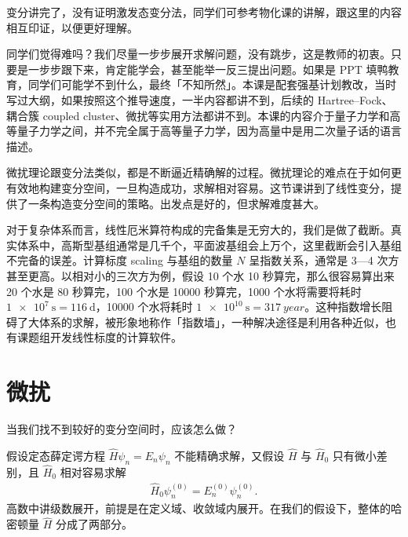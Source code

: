 
变分讲完了，没有证明激发态变分法，同学们可参考物化课的讲解，跟这里的内容相互印证，以便更好理解。

同学们觉得难吗？我们尽量一步步展开求解问题，没有跳步，这是教师的初衷。只要是一步步跟下来，肯定能学会，甚至能举一反三提出问题。如果是 PPT 填鸭教育，同学们可能学不到什么，最终「不知所然」。本课是配套强基计划教改，当时写过大纲，如果按照这个推导速度，一半内容都讲不到，后续的 Hartree--Fock、耦合簇 coupled cluster、微扰等实用方法都讲不到。本课的内容介于量子力学和高等量子力学之间，并不完全属于高等量子力学，因为高量中是用二次量子话的语言描述。

微扰理论跟变分法类似，都是不断逼近精确解的过程。微扰理论的难点在于如何更有效地构建变分空间，一旦构造成功，求解相对容易。这节课讲到了线性变分，提供了一条构造变分空间的策略。出发点是好的，但求解难度甚大。

对于复杂体系而言，线性厄米算符构成的完备集是无穷大的，我们是做了截断。真实体系中，高斯型基组通常是几千个，平面波基组会上万个，这里截断会引入基组不完备的误差。计算标度 scaling 与基组的数量 $N$ 呈指数关系，通常是 3---4 次方甚至更高。以相对小的三次方为例，假设 10 个水 10 秒算完，那么很容易算出来 20 个水是 80 秒算完，100 个水是 \num{10000} 秒算完，1000 个水将需要将耗时 $\SI{1e7}{\second} = \SI{116}{\day}$，\num{10000} 个水将耗时 $\SI{1e10}{\second} = \SI{317}{year}$。这种指数增长阻碍了大体系的求解，被形象地称作「指数墙」，一种解决途径是利用各种近似，也有课题组开发线性标度的计算软件。

\chapter{微扰}
当我们找不到较好的变分空间时，应该怎么做？

假设定态薛定谔方程 $\hat H \psi_n = E_n \psi_n$ 不能精确求解，又假设 $\hat H$ 与 $\hat H_0$ 只有微小差别，且 $\hat H_0$ 相对容易求解
\begin{align}
    \hat H_0 \psi_n^{(0)} = E_n^{(0)} \psi_n^{(0)}. 
\end{align}
高数中讲级数展开，前提是在定义域、收敛域内展开。在我们的假设下，整体的哈密顿量 $\hat H$ 分成了两部分。

